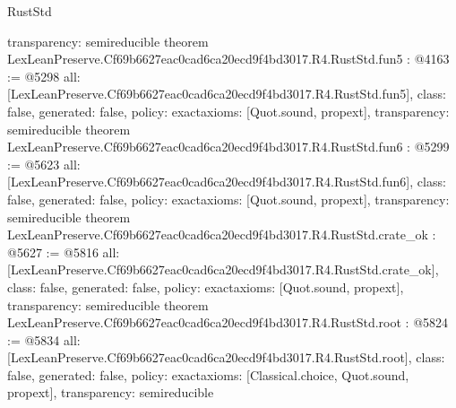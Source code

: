 \begin{lexlean}{RustStd}
\begin{coremodule}
{  transparency: semireducible
}
theorem LexLeanPreserve.Cf69b6627eac0cad6ca20ecd9f4bd3017.R4.RustStd.fun5 : @4163 := @5298 {
  all: [LexLeanPreserve.Cf69b6627eac0cad6ca20ecd9f4bd3017.R4.RustStd.fun5],
  class: false,
  generated: false,
  policy: exact{axioms: [Quot.sound, propext]},
  transparency: semireducible
}
theorem LexLeanPreserve.Cf69b6627eac0cad6ca20ecd9f4bd3017.R4.RustStd.fun6 : @5299 := @5623 {
  all: [LexLeanPreserve.Cf69b6627eac0cad6ca20ecd9f4bd3017.R4.RustStd.fun6],
  class: false,
  generated: false,
  policy: exact{axioms: [Quot.sound, propext]},
  transparency: semireducible
}
theorem LexLeanPreserve.Cf69b6627eac0cad6ca20ecd9f4bd3017.R4.RustStd.crate_ok : @5627 := @5816 {
  all: [LexLeanPreserve.Cf69b6627eac0cad6ca20ecd9f4bd3017.R4.RustStd.crate_ok],
  class: false,
  generated: false,
  policy: exact{axioms: [Quot.sound, propext]},
  transparency: semireducible
}
theorem LexLeanPreserve.Cf69b6627eac0cad6ca20ecd9f4bd3017.R4.RustStd.root : @5824 := @5834 {
  all: [LexLeanPreserve.Cf69b6627eac0cad6ca20ecd9f4bd3017.R4.RustStd.root],
  class: false,
  generated: false,
  policy: exact{axioms: [Classical.choice, Quot.sound, propext]},
  transparency: semireducible
}


\end{coremodule}
\end{lexlean}
